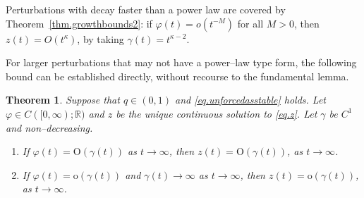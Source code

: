 \documentclass[a4paper,10pt,reqno]{amsart}
\numberwithin{equation}{section}
\newtheorem{theorem}{Theorem}
\theoremstyle{definition}
\theoremstyle{remark}
\DeclareMathOperator{\1}{\mathbbm 1}
\begin{document}
	Perturbations with decay faster than a power law  are covered by Theorem~\ref{thm.growthbounds2}: if $\varphi(t)=o(t^{-M})$ for all $M>0$, then $z(t)=O(t^\kappa)$, by taking $\gamma(t)=t^{\kappa-2}$. 
	
	For larger perturbations that may not have a power--law type form, the following bound can be established directly, without recourse to the fundamental lemma. 
	
	\begin{theorem} \label{thm.monotonepert}
		Suppose that $q\in (0,1)$ and \eqref{eq.unforcedasstable} holds. Let $\varphi\in C([0,\infty);\mathbb{R})$ and $z$ be the unique continuous solution to \eqref{eq.z}. Let $\gamma$ be  $C^1$ and non--decreasing.
		\begin{enumerate}
			\item[(A)]
			If $\varphi(t)=\text{O}(\gamma(t))$ as $t\to\infty$, then $z(t)=\text{O}(\gamma(t))$, as $t\to\infty$. 
			\item[(B)] If $\varphi(t)=\text{o}(\gamma(t))$ and $\gamma(t)\to \infty$ as $t\to\infty$, then $z(t)=\text{o}(\gamma(t))$, as $t\to\infty$. 
		\end{enumerate}
	\end{theorem}
\end{document}
